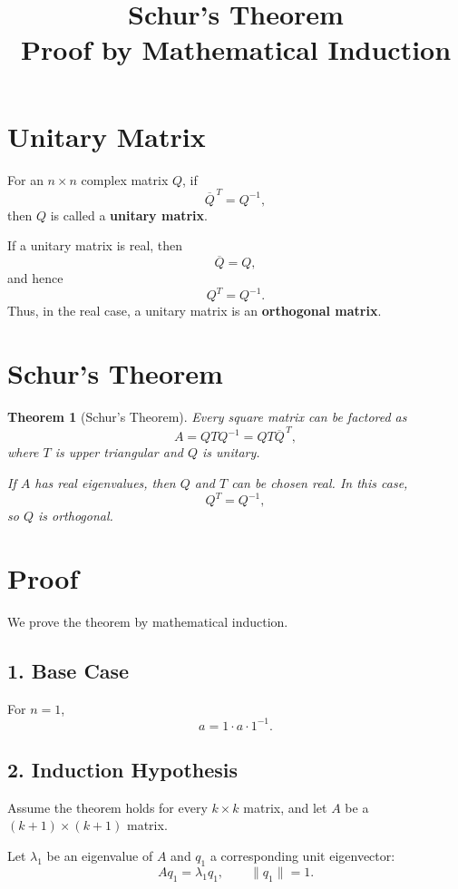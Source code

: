 \documentclass[12pt,a4paper]{article}
\title{\textbf{Schur's Theorem}\\
\large Proof by Mathematical Induction}
\author{}
\date{}
\newtheorem{theorem}{Theorem}
\begin{document}
\maketitle

\section{Unitary Matrix}

For an $n\times n$ complex matrix $Q$, if
\[
    \overline{Q}^{\,T}=Q^{-1},
\]
then $Q$ is called a \textbf{unitary matrix}.

If a unitary matrix is real, then
\[
    \overline{Q}=Q,
\]
and hence
\[
    Q^T=Q^{-1}.
\]
Thus, in the real case, a unitary matrix is an \textbf{orthogonal matrix}.

\section{Schur's Theorem}

\begin{theorem}[Schur's Theorem]
    Every square matrix can be factored as
    \[
        \boxed{
            A=QTQ^{-1}=QT\overline{Q}^{\,T},
        }
    \]
    where $T$ is upper triangular and $Q$ is unitary.

    If $A$ has real eigenvalues, then $Q$ and $T$ can be chosen real. In this case,
    \[
        Q^T=Q^{-1},
    \]
    so $Q$ is orthogonal.
\end{theorem}

\section{Proof}

We prove the theorem by mathematical induction.

\subsection*{1. Base Case}

For $n=1$,
\[
    a=1\cdot a\cdot 1^{-1}.
\]

\subsection*{2. Induction Hypothesis}

Assume the theorem holds for every $k\times k$ matrix, and let $A$ be a
$(k+1)\times(k+1)$ matrix.

Let $\lambda_1$ be an eigenvalue of $A$ and $q_1$ a corresponding unit eigenvector:
\[
    Aq_1=\lambda_1q_1,
    \qquad
    \|q_1\|=1.
\]
\end{document}
